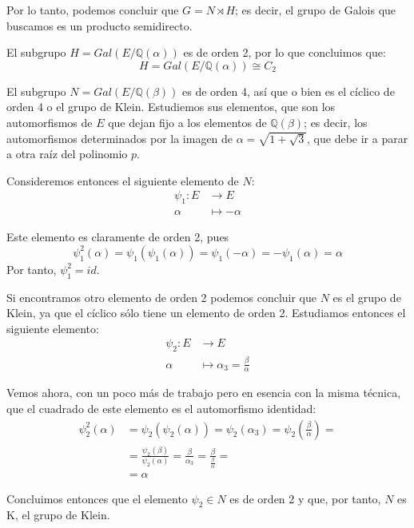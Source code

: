 \documentclass[a4paper, 11pt]{article}
\begin{document}
\begin{solucion}
      Por lo tanto, podemos concluir que $G = N \rtimes H$; es decir, el grupo de Galois que buscamos es un producto semidirecto.

      El subgrupo $H = Gal(E/\mathbb{Q}(\alpha))$ es de orden 2, por lo que concluimos que:
      \[
      H = Gal(E/\mathbb{Q}(\alpha)) \cong C_2
      \]

      El subgrupo $N = Gal(E/\mathbb{Q}(\beta))$ es de orden 4, así que o bien es el cíclico de orden 4 o el grupo de Klein. Estudiemos sus elementos, que son los automorfismos de $E$ que dejan fijo a los elementos de $\mathbb{Q}(\beta)$; es decir, los automorfismos determinados por la imagen de $\alpha = \sqrt{1 + \sqrt{3}}$, que debe ir a parar a otra raíz del polinomio $p$.

      Consideremos entonces el siguiente elemento de $N$:
      \begin{align*}
          \psi_1 : E &\longrightarrow E \\
          \alpha &\longmapsto -\alpha
      \end{align*}

      Este elemento es claramente de orden 2, pues
      \[
      \psi_1^2(\alpha) = \psi_1(\psi_1(\alpha)) = \psi_1(-\alpha) = -\psi_1(\alpha) = \alpha
      \]
      Por tanto, $\psi_1^2 = id$.

      Si encontramos otro elemento de orden 2 podemos concluir que $N$ es el grupo de Klein, ya que el cíclico sólo tiene un elemento de orden 2. Estudiamos entonces el siguiente elemento:
      \begin{align*}
          \psi_2 : E &\longrightarrow E \\
          \alpha &\longmapsto \alpha_3 = \frac{\beta}{\alpha}
      \end{align*}

      Vemos ahora, con un poco más de trabajo pero en esencia con la misma técnica, que el cuadrado de este elemento es el automorfismo identidad:
      \begin{align*}
          \psi_2^2(\alpha) &= \psi_2(\psi_2(\alpha)) = \psi_2(\alpha_3) = \psi_2(\frac{\beta}{\alpha}) =\\
          &= \frac{\psi_2(\beta)}{\psi_2(\alpha)} = \frac{\beta}{\alpha_3} = \frac{\beta}{\frac{\beta}{\alpha}} = \\
          &= \alpha
      \end{align*}

      Concluimos entonces que el elemento $\psi_2 \in N$ es de orden 2 y que, por tanto, $N$ es K, el grupo de Klein.


\end{solucion}
\end{document}
